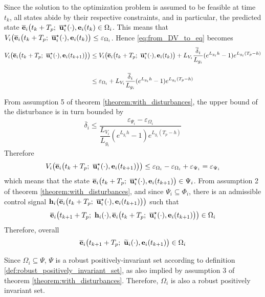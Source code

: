 \begin{gg_box}
Since the solution to the optimization problem is assumed to be feasible
at time $t_k$, all states abide by their respective constraints, and in
particular, the predicted state
$\overline{\bm{\mathbf{e}}}_i\big(t_k + T_p;\ \overline{\bm{\mathbf{u}}}_i^{\star}(\cdot), \bm{\mathbf{e}}_i(t_k) \in \Omega_i$.
This means that
$V_i\big(\overline{\vect{e}}_i\big(t_k + T_p;\ \overline{\vect{u}}_i^{\star}(\cdot), \vect{e}_i(t_k)\big) \leq \varepsilon_{\Omega_i}$.
Hence \eqref{eq:from_DV_to_eq} becomes
\begin{align}
  V_i\big(\overline{\vect{e}}_i\big(t_k + T_p;\ \overline{\vect{u}}_i^{\star}(\cdot), \vect{e}_i(t_{k+1})\big)\big)
  &\leq V_i\big(\overline{\vect{e}}_i\big(t_k + T_p;\ \overline{\vect{u}}_i^{\star}(\cdot), \vect{e}_i(t_k)\big) + L_{V_i} \dfrac{\overline{\delta}_i}{L_{g_i}} (e^{L_{g_i}h} - 1) e^{L_{g_i} (T_p - h)} \\[2.5ex]
  &\leq \varepsilon_{\Omega_i} + L_{V_i} \dfrac{\overline{\delta}_i}{L_{g_i}} (e^{L_{g_i}h} - 1) e^{L_{g_i} (T_p - h)}
\label{eq:from_DV_to_eq_2}
\end{align}

From assumption 5 of theorem \eqref{theorem:with_disturbances},
the upper bound of the disturbance is in turn bounded by
\begin{align}
  \overline{\delta}_i \leq \dfrac{\varepsilon_{\Psi_i} - \varepsilon_{\Omega_i}}{\dfrac{L_{V_i}}{L_{g_i}} (e^{L_{g_i}h} - 1) e^{L_{g_i} (T_p - h)}}
\end{align}
Therefore
\begin{align}
  V_i\big(\overline{\vect{e}}_i\big(t_k + T_p;\ \overline{\vect{u}}_i^{\star}(\cdot), \vect{e}_i(t_{k+1})\big)\big)
  \leq  \varepsilon_{\Omega_i} - \varepsilon_{\Omega_i} + \varepsilon_{\Psi_i} = \varepsilon_{\Psi_i}
\end{align}
which means that the state
$\overline{\vect{e}}_i\big(t_k + T_p;\ \overline{\vect{u}}_i^{\star}(\cdot), \vect{e}_i(t_{k+1})\big) \in \Psi_i$.
From assumption 2 of theorem \eqref{theorem:with_disturbances},
and since $\Psi_i \subseteq \Phi_i$, there is an admissible control signal
$\bm{\mathbf{h}}_i\big(\overline{\bm{\mathbf{e}}}_i\big(t_k + T_p;\ \overline{\bm{\mathbf{u}}}_i^{\star}(\cdot), \bm{\mathbf{e}}_i(t_{k+1})\big)\big)$
such that
\begin{align}
  \overline{\vect{e}}_i\big(t_{k+1} + T_p;\ \vect{h}_i(\cdot), \overline{\vect{e}}_i\big(t_k + T_p;\ \overline{\vect{u}}_i^{\star}(\cdot), \vect{e}_i(t_{k+1})\big)\big) \in \Omega_i
\end{align}
Therefore, overall
\begin{align}
  \overline{\vect{e}}_i\big(t_{k+1} + T_p;\ \widetilde{\vect{u}}_i(\cdot), \vect{e}_i(t_{k+1}) \big) \in \Omega_i
\end{align}
\qedsymbol

\begin{remark}
  Since $\Omega_i \subseteq \Psi$, $\Psi$ is a robust positively-invariant
  set according to definition \eqref{def:robust_positively_invariant_set},
  as also implied by assumption 3 of theorem \eqref{theorem:with_disturbances}.
  Therefore, $\Omega_i$ is also a robust positively invariant set.
\end{remark}
\end{gg_box}
